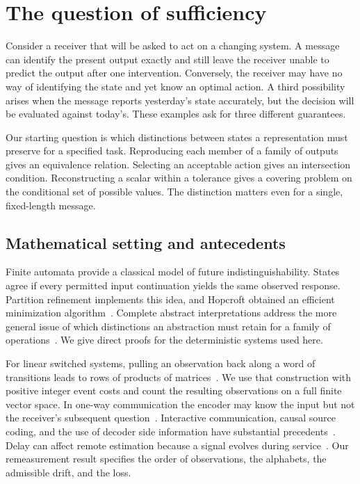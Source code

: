 \section{The question of sufficiency}
Consider a receiver that will be asked to act on a changing system. A message can identify the present output exactly and still leave the receiver unable to predict the output after one intervention. Conversely, the receiver may have no way of identifying the state and yet know an optimal action. A third possibility arises when the message reports yesterday's state accurately, but the decision will be evaluated against today's. These examples ask for three different guarantees.

Our starting question is which distinctions between states a representation must preserve for a specified task. Reproducing each member of a family of outputs gives an equivalence relation. Selecting an acceptable action gives an intersection condition. Reconstructing a scalar within a tolerance gives a covering problem on the conditional set of possible values. The distinction matters even for a single, fixed-length message.

\subsection{Mathematical setting and antecedents}
Finite automata provide a classical model of future indistinguishability. States agree if every permitted input continuation yields the same observed response. Partition refinement implements this idea, and Hopcroft obtained an efficient minimization algorithm~\cite{hopcroft}. Complete abstract interpretations address the more general issue of which distinctions an abstraction must retain for a family of operations~\cite{giacobazzi}. We give direct proofs for the deterministic systems used here.

For linear switched systems, pulling an observation back along a word of transitions leads to rows of products of matrices~\cite{petreczky}. We use that construction with positive integer event costs and count the resulting observations on a full finite vector space. In one-way communication the encoder may know the input but not the receiver's subsequent question~\cite{roughgarden}. Interactive communication, causal source coding, and the use of decoder side information have substantial precedents~\cite{ahlswede1997,kaspi2013,mayekar2021}. Delay can affect remote estimation because a signal evolves during service~\cite{sun2019}. Our remeasurement result specifies the order of observations, the alphabets, the admissible drift, and the loss.

